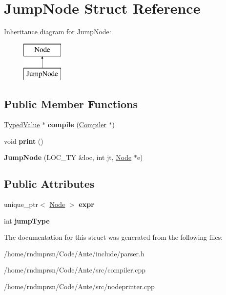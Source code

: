 \hypertarget{structJumpNode}{}\section{Jump\+Node Struct Reference}
\label{structJumpNode}
Inheritance diagram for Jump\+Node\+:\begin{figure}[H]
\begin{center}
\leavevmode
\includegraphics[height=2.000000cm]{structJumpNode}
\end{center}
\end{figure}
\subsection*{Public Member Functions}
\begin{DoxyCompactItemize}
\item 
\mbox{\label{structJumpNode_a62bf981d2843ca5b1373d22507f9cc40}} 
\hyperlink{structTypedValue}{Typed\+Value} $\ast$ {\bfseries compile} (\hyperlink{structante_1_1Compiler}{Compiler} $\ast$)
\item 
\mbox{\label{structJumpNode_ac33884600ba8588ed2107ab4d30beead}} 
void {\bfseries print} ()
\item 
\mbox{\label{structJumpNode_ae6e0f1444fec1e6c6c3f5c2dfa867c6b}} 
{\bfseries Jump\+Node} (L\+O\+C\+\_\+\+TY \&loc, int jt, \hyperlink{structNode}{Node} $\ast$e)
\end{DoxyCompactItemize}
\subsection*{Public Attributes}
\begin{DoxyCompactItemize}
\item 
\mbox{\label{structJumpNode_a3ddba7c1e683370c11dc69f8eaf40704}} 
unique\+\_\+ptr$<$ \hyperlink{structNode}{Node} $>$ {\bfseries expr}
\item 
\mbox{\label{structJumpNode_ab9fcd59ccdaabf75fd8d4d3413ec48f5}} 
int {\bfseries jump\+Type}
\end{DoxyCompactItemize}


The documentation for this struct was generated from the following files\+:\begin{DoxyCompactItemize}
\item 
/home/rndmprsn/\+Code/\+Ante/include/parser.\+h\item 
/home/rndmprsn/\+Code/\+Ante/src/compiler.\+cpp\item 
/home/rndmprsn/\+Code/\+Ante/src/nodeprinter.\+cpp\end{DoxyCompactItemize}
